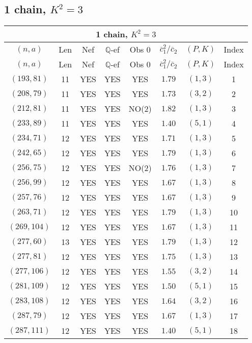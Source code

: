 \subsection{1 chain, $K^2 = 3$}
\begin{longtable}{|c|c|c|c|c|c|c|c|}
\hline
\multicolumn{8}{|c|}{1 chain, $K^2 = 3$}\\
\hline
$(n,a)$ & Len & Nef & $\mathbb Q$-ef & Obs 0 & $\overline c_1^2 / \overline c_2$ & $(P,K)$ & Index\\
\hline
\endfirsthead

\hline
$(n,a)$ & Len & Nef & $\mathbb Q$-ef & Obs 0 & $\overline c_1^2 / \overline c_2$ & $(P,K)$ & Index\\
\hline
\endhead
\hline
\endfoot

$(193,81)$ & 11 & YES & YES & YES & $1.79$ & $(1,3)$ & 1\\
$(208,79)$ & 11 & YES & YES & YES & $1.73$ & $(3,2)$ & 2\\
$(212,81)$ & 11 & YES & YES & NO(2) & $1.82$ & $(1,3)$ & 3\\
$(233,89)$ & 11 & YES & YES & YES & $1.40$ & $(5,1)$ & 4\\
$(234,71)$ & 12 & YES & YES & YES & $1.71$ & $(1,3)$ & 5\\
$(242,65)$ & 12 & YES & YES & YES & $1.79$ & $(1,3)$ & 6\\
$(256,75)$ & 12 & YES & YES & NO(2) & $1.76$ & $(1,3)$ & 7\\
$(256,99)$ & 12 & YES & YES & YES & $1.67$ & $(1,3)$ & 8\\
$(257,76)$ & 12 & YES & YES & YES & $1.67$ & $(1,3)$ & 9\\
$(263,71)$ & 12 & YES & YES & YES & $1.79$ & $(1,3)$ & 10\\
$(269,104)$ & 12 & YES & YES & YES & $1.67$ & $(1,3)$ & 11\\
$(277,60)$ & 13 & YES & YES & YES & $1.79$ & $(1,3)$ & 12\\
$(277,81)$ & 12 & YES & YES & YES & $1.75$ & $(1,3)$ & 13\\
$(277,106)$ & 12 & YES & YES & YES & $1.55$ & $(3,2)$ & 14\\
$(281,109)$ & 12 & YES & YES & YES & $1.50$ & $(5,1)$ & 15\\
$(283,108)$ & 12 & YES & YES & YES & $1.64$ & $(3,2)$ & 16\\
$(287,79)$ & 12 & YES & YES & YES & $1.67$ & $(1,3)$ & 17\\
$(287,111)$ & 12 & YES & YES & YES & $1.40$ & $(5,1)$ & 18\\

\end{longtable}
